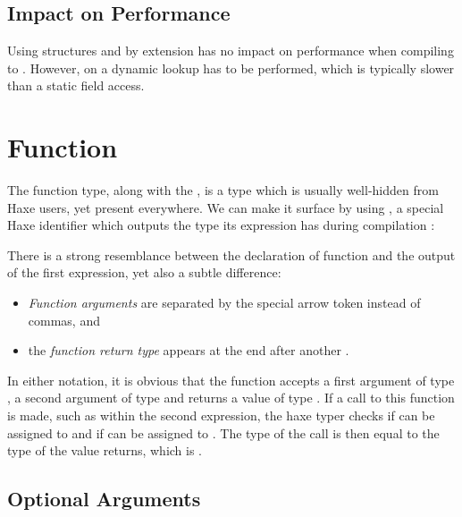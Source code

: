 \documentclass{haxe}
\begin{document}

\subsection{Impact on Performance}
\label{types-structure-performance}

Using structures and by extension  has no impact on performance when compiling to . However, on  a dynamic lookup has to be performed, which is typically slower than a static field access.



\section{Function}
\label{types-function}

The function type, along with the , is a type which is usually well-hidden from Haxe users, yet present everywhere. We can make it surface by using , a special Haxe identifier which outputs the type its expression has during compilation :


There is a strong resemblance between the declaration of function  and the output of the first  expression, yet also a subtle difference:

\begin{itemize}
	\item \emph{Function arguments} are separated by the special arrow token \expr{->} instead of commas, and
	\item the \emph{function return type} appears at the end after another \expr{->}.
\end{itemize}
In either notation, it is obvious that the function  accepts a first argument of type , a second argument of type  and returns a value of type . If a call to this function is made, such as  within the second  expression, the haxe typer checks if  can be assigned to  and if  can be assigned to . The type of the call is then equal to the type of the value  returns, which is .


\subsection{Optional Arguments}
\label{types-function-optional-arguments}
\end{document}
